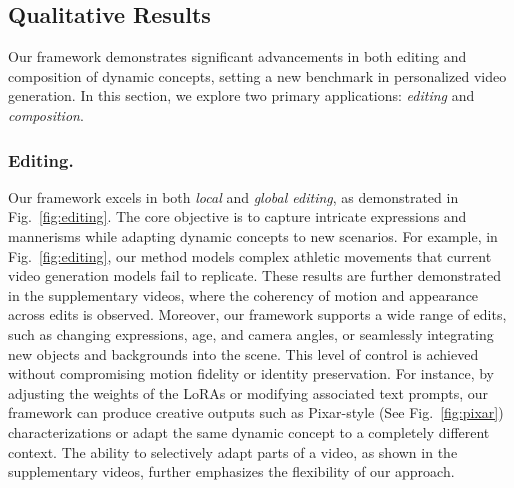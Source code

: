 \subsection{Qualitative Results}

Our framework demonstrates significant advancements in both editing and composition of dynamic concepts, setting a new benchmark in personalized video generation. In this section, we explore two primary applications: \textit{editing} and \textit{composition}.

\subsubsection{Editing.} Our framework excels in both \textit{local} and \textit{global editing}, as demonstrated in Fig.~\ref{fig:editing}. The core objective is to capture intricate expressions and mannerisms while adapting dynamic concepts to new scenarios. For example, in Fig.~\ref{fig:editing}, our method models complex athletic movements that current video generation models fail to replicate. These results are further demonstrated in the supplementary videos, where the coherency of motion and appearance across edits is observed. Moreover, our framework supports a wide range of edits, such as changing expressions, age, and camera angles, or seamlessly integrating new objects and backgrounds into the scene. This level of control is achieved without compromising motion fidelity or identity preservation. For instance, by adjusting the weights of the LoRAs or modifying associated text prompts, our framework can produce creative outputs such as Pixar-style (See Fig.~\ref{fig:pixar}) characterizations or adapt the same dynamic concept to a completely different context. The ability to selectively adapt parts of a video, as shown in the supplementary videos, further emphasizes the flexibility of our approach.

